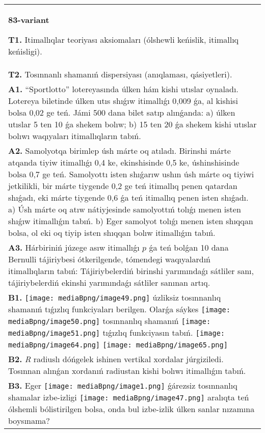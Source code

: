 \documentclass{article}
\begin{document}
\begin{tabular}{m{17cm}}
\textbf{83-variant}
\newline

\textbf{T1.} Itimallıqlar teoriyası aksiomaları (ólshewli keńislik, itimallıq keńisligi).
 \\
\textbf{T2.} Tosınnanlı shamanıń dispersiyası (anıqlaması, qásiyetleri).
 \\
\textbf{A1.} 
“Sportlotto” lotereyasında úlken hám kishi utıslar oynaladı. Lotereya biletinde úlken utıs shıǵıw itimallıǵı 0,009 ǵa, al kishisi bolsa 0,02 ge teń. Jámi 500 dana bilet satıp alınǵanda: a) úlken utıslar 5 ten 10 ǵa shekem bolıw; b) 15 ten 20 ǵa shekem kishi utıslar bolıwı waqıyaları itimallıqların tabıń.
 \\
\textbf{A2.} Samolyotqa birimlep úsh márte oq atıladı. Birinshi márte atqanda tiyiw itimallıǵı 0,4 ke, ekinshisinde 0,5 ke, úshinshisinde bolsa 0,7 ge teń. Samolyottı isten shıǵarıw ushın úsh márte oq tiyiwi jetkilikli, bir márte tiygende 0,2 ge teń itimallıq penen qatardan shıǵadı, eki márte tiygende 0,6 ǵa teń itimallıq penen isten shıǵadı. 
a) Úsh márte oq atıw nátiyjesinde samolyottıń tolıǵı menen isten shıǵıw itimallıǵın tabıń. b) Eger samolyot tolıǵı menen isten shıqqan bolsa, ol eki oq tiyip isten shıqqan bolıw itimallıǵın tabıń.
 \\
\textbf{A3.} Hárbiriniń júzege asıw itimallıǵı $p$ ǵa teń bolǵan 10 dana Bernulli tájiriybesi ótkerilgende, tómendegi waqıyalardıń itimallıqların tabıń: Tájiriybelerdiń birinshi yarımındaǵı sátliler sanı, tájiriybelerdiń ekinshi yarımındaǵı sátliler sanınan artıq.
 \\
\textbf{B1.} \texttt{[image: mediaBpng/image49.png]} úzliksiz tosınnanlıq shamanıń tıǵızlıq funkciyaları berilgen. Olarǵa sáykes \texttt{[image: mediaBpng/image50.png]} tosınnanlıq shamanıń \texttt{[image: mediaBpng/image51.png]} tıǵızlıq funkciyasın tabıń. \texttt{[image: mediaBpng/image64.png]} \texttt{[image: mediaBpng/image65.png]}
 \\
\textbf{B2.} \emph{R} radiuslı dóńgelek ishinen vertikal xordalar júrgiziledi. Tosınnan alınǵan xordanıń radiustan kishi bolıwı itimallıǵın tabıń.
 \\
\textbf{B3.} Eger \texttt{[image: mediaBpng/image1.png]} ǵárezsiz tosınnanlıq shamalar izbe-izligi \texttt{[image: mediaBpng/image47.png]} aralıqta teń ólshemli bólistirilgen bolsa, onda bul izbe-izlik úlken sanlar nızamına boysınama?

\end{tabular}
\end{document}
